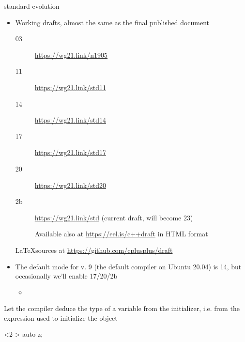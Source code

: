 \begin{frame}{\Cpp{} standard evolution}

  \begin{itemize}
  \item Working drafts, almost the same as the final published document
    \begin{description}
    \item [\Cpp{}03] \url{https://wg21.link/n1905}
    \item [\Cpp{}11] \url{https://wg21.link/std11}
    \item [\Cpp{}14] \url{https://wg21.link/std14}
    \item [\Cpp{}17] \url{https://wg21.link/std17}
    \item [\Cpp{}20] \url{https://wg21.link/std20}
    \item [\Cpp{}2b] \url{https://wg21.link/std} (current draft, will become
      \Cpp{}23)

      Available also at \url{https://eel.is/c++draft} in HTML format
    \end{description}

    \LaTeX sources at \url{https://github.com/cplusplus/draft}

  \item The default mode for  v. 9 (the default compiler on Ubuntu
    20.04) is \Cpp{}14, but occasionally we'll enable \Cpp{}17/20/2b
    \begin{itemize}
    \item {}
    \end{itemize}
  \end{itemize}

\end{frame}

\begin{frame}[fragile]{}

  Let the compiler deduce the type of a variable from the initializer, i.e. from
  the expression used to initialize the object

  \begin{codeblock}<2->{
auto z;                }\end{codeblock}

\end{frame}


